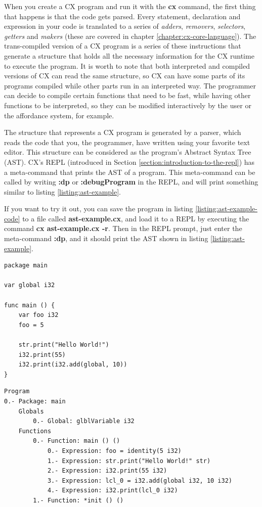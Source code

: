 \documentclass[11pt,fleqn,openany]{book} %
\begin{document}
When you create a CX program and run it with the \textbf{cx} command, the first thing that happens is that the code gets parsed. Every statement, declaration and expression in your code is translated to a series of \textit{adders}, \textit{removers}, \textit{selectors}, \textit{getters} and \textit{makers} (these are covered in chapter \ref{chapter:cx-core-language}). The trans-compiled version of a CX program is a series of these instructions that generate a structure that holds all the necessary information for the CX runtime to execute the program. It is worth to note that both interpreted and compiled versions of CX can read the same structure, so CX can have some parts of its programs compiled while other parts run in an interpreted way. The programmer can decide to compile certain functions that need to be fast, while having other functions to be interpreted, so they can be modified interactively by the user or the affordance system, for example.

The structure that represents a CX program is generated by a parser, which reads the code that you, the programmer, have written using your favorite text editor. This structure can be considered as the program's Abstract Syntax Tree (AST). CX's REPL (introduced in Section \ref{section:introduction-to-the-repl}) has a meta-command that prints the AST of a program. This meta-command can be called by writing \textbf{:dp} or \textbf{:debugProgram} in the REPL, and will print something similar to listing \ref{listing:ast-example}.

If you want to try it out, you can save the program in listing \ref{listing:ast-example-code} to a file called \textbf{ast-example.cx}, and load it to a REPL by executing the command \textbf{cx ast-example.cx -r}. Then in the REPL prompt, just enter the meta-command \textbf{:dp}, and it should print the AST shown in listing \ref{listing:ast-example}.
        
\begin{lstlisting}[caption={Abstract syntax tree example - code},captionpos=b,label={listing:ast-example-code}]
package main

var global i32

func main () {
	var foo i32
	foo = 5
	
 	str.print("Hello World!")
	i32.print(55)
	i32.print(i32.add(global, 10))
}
\end{lstlisting}

\begin{lstlisting}[caption={Abstract syntax tree example},captionpos=b,label={listing:ast-example}]
Program
0.- Package: main
	Globals
		0.- Global: glblVariable i32
	Functions
		0.- Function: main () ()
			0.- Expression: foo = identity(5 i32)
			1.- Expression: str.print("Hello World!" str)
			2.- Expression: i32.print(55 i32)
			3.- Expression: lcl_0 = i32.add(global i32, 10 i32)
			4.- Expression: i32.print(lcl_0 i32)
		1.- Function: *init () ()
\end{lstlisting}
\end{document}
